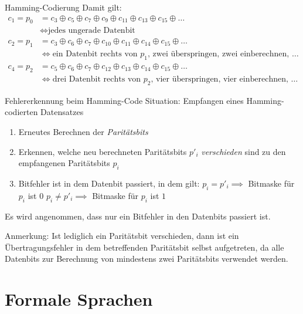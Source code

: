 \documentclass[german]{../spicker}
\begin{document}
\begin{defi}{Hamming-Codierung}
    Damit gilt:
    $$
        \begin{aligned}
            c_1 = p_0 & = c_3 \oplus c_5 \oplus c_7 \oplus c_9 \oplus c_{11} \oplus c_{13} \oplus c_{15} \oplus \ldots    \\
                      & \iff \text{jedes ungerade Datenbit}                                                               \\
            c_2 = p_1 & = c_3 \oplus c_6 \oplus c_7 \oplus c_{10} \oplus c_{11} \oplus c_{14} \oplus c_{15} \oplus \ldots \\
                      & \iff \text{ein Datenbit rechts von $p_1$, zwei überspringen, zwei einberechnen, $\ldots$}         \\
            c_4 = p_2 & = c_5 \oplus c_6 \oplus c_7 \oplus c_{12} \oplus c_{13} \oplus c_{14} \oplus c_{15} \oplus \ldots \\
                      & \iff \text{drei Datenbit rechts von $p_2$, vier überspringen, vier einberechnen, $\ldots$}
        \end{aligned}
    $$
\end{defi}

\begin{algo}{Fehlererkennung beim Hamming-Code}
    Situation: Empfangen eines Hamming-codierten Datensatzes

    \begin{enumerate}
        \item Erneutes Berechnen der \emph{Paritätsbits}
        \item Erkennen, welche neu berechneten Paritätsbits $p'_i$ \emph{verschieden} sind zu den empfangenen Paritätsbits $p_i$
        \item Bitfehler ist in dem Datenbit passiert, in dem gilt:
              \subitem $p_i = p'_i \implies$ Bitmaske für $p_i$ ist $0$
              \subitem $p_i \neq p'_i \implies$ Bitmaske für $p_i$ ist $1$
    \end{enumerate}

    Es wird angenommen, dass nur ein Bitfehler in den Datenbits passiert ist.

    Anmerkung: Ist lediglich ein Paritätsbit verschieden, dann ist ein Übertragungsfehler in dem betreffenden Paritätsbit selbst aufgetreten, da alle Datenbits zur Berechnung von mindestens zwei Paritätsbits verwendet werden.
\end{algo}

\section{Formale Sprachen}
\end{document}

